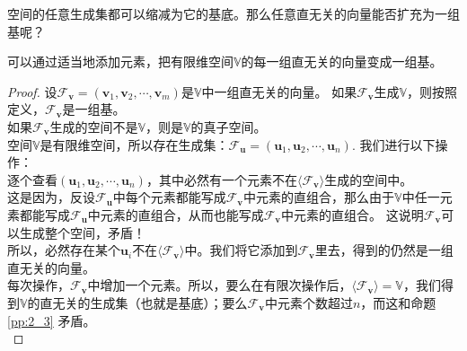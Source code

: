 \documentclass[12pt,UTF8]{ctexbook}
\begin{document}
空间的任意生成集都可以缩减为它的基底。那么任意直无关的向量能否扩充为一组基呢？
\begin{pp}\label{pp:2_7}
    可以通过适当地添加元素，把有限维空间$\mathbb{V}$的每一组直无关的向量变成一组基。
\end{pp}
\begin{proof} %
    设$\mathcal{F}_{\mathbf{v}} = (\mathbf{v}_1, \mathbf{v}_2, \cdots , \mathbf{v}_m )$是$\mathbb{V}$中一组直无关的向量。
    如果$\mathcal{F}_{\mathbf{v}}$生成$\mathbb{V}$，则按照定义，$\mathcal{F}_{\mathbf{v}}$是一组基。\\
    如果$\mathcal{F}_{\mathbf{v}}$生成的空间不是$\mathbb{V}$，则是$\mathbb{V}$的真子空间。\\
    空间$\mathbb{V}$是有限维空间，所以存在生成集：$\mathcal{F}_{\mathbf{u}} = (\mathbf{u}_1, \mathbf{u}_2, \cdots , \mathbf{u}_n )$. 我们进行以下操作：\\
    逐个查看$(\mathbf{u}_1, \mathbf{u}_2, \cdots , \mathbf{u}_n )$，其中必然有一个元素不在$\langle\mathcal{F}_{\mathbf{v}}\rangle$生成的空间中。\\
    这是因为，反设$\mathcal{F}_{\mathbf{u}}$中每个元素都能写成$\mathcal{F}_{\mathbf{v}}$中元素的直组合，那么由于$\mathbb{V}$中任一元素都能写成$\mathcal{F}_{\mathbf{u}}$中元素的直组合，从而也能写成$\mathcal{F}_{\mathbf{v}}$中元素的直组合。
    这说明$\mathcal{F}_{\mathbf{v}}$可以生成整个空间，矛盾！\\
    所以，必然存在某个$\mathbf{u}_i$不在$\langle\mathcal{F}_{\mathbf{v}}\rangle$中。我们将它添加到$\mathcal{F}_{\mathbf{v}}$里去，得到的仍然是一组直无关的向量。\\
    每次操作，$\mathcal{F}_{\mathbf{v}}$中增加一个元素。所以，要么在有限次操作后，$\langle\mathcal{F}_{\mathbf{v}}\rangle = \mathbb{V}$，我们得到$\mathbb{V}$的直无关的生成集（也就是基底）；要么$\mathcal{F}_{\mathbf{v}}$中元素个数超过$n$，而这和命题\ref{pp:2_3} 矛盾。\\
\end{proof}
\end{document}
